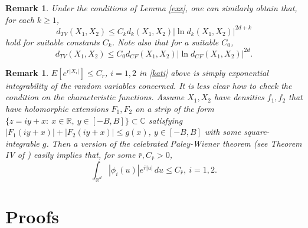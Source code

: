 \documentclass{article}
\newtheorem{remark}[theorem]{Remark}
\begin{document}
\begin{remark}{\rm Under the conditions of Lemma \ref{exx},
one can similarly obtain that, for each $k\geq 1$,
$$
d_{TV}(X_{1},X_{2})\leq C_{k} d_{k}(X_{1},X_{2})|\ln d_{k}(X_{1},X_{2})|^{2d+k}
$$
hold for suitable constants $C_{k}$. Note also that for a suitable $C_{0}$,
$$
d_{TV}(X_{1},X_{2})\leq C_{0} d_{CF}(X_{1},X_{2})|\ln d_{CF}(X_{1},X_{2})|^{2d}.
$$
}
\end{remark}

\begin{remark}
{\rm $E[e^{r|X_{i}|}]\leq C_{r}$, $i=1,2$ in \eqref{kati} above is simply exponential integrability
of the random variables concerned. It is less clear how to check the condition on the characteristic functions. 
Assume $X_{1},X_{2}$ have densities $f_{1},f_{2}$ that have holomorphic extensions $F_{1},F_{2}$
on a strip of the form $\{z=iy+x:\ x\in\mathbb{R},\ y\in [-B,B]\}\subset\mathbb{C}$ satisfying $|F_{1}(iy+x)|+|F_{2}(iy+x)|\leq g(x)$, 
$y\in [-B,B]$ with 
some square-integrable $g$. Then a version of the celebrated Paley-Wiener theorem (see Theorem IV of \cite{pw}) 
easily implies that, for some $\bar{r},C_{\bar{r}}>0$, 
$$
\int_{\mathbb{R}^{d}}|\phi_{i}(u)|e^{\bar{r}|u|}\, du\leq C_{\bar{r}},\ i=1,2.
$$
}	
\end{remark}


\section{Proofs}\label{pofs}
\end{document}
